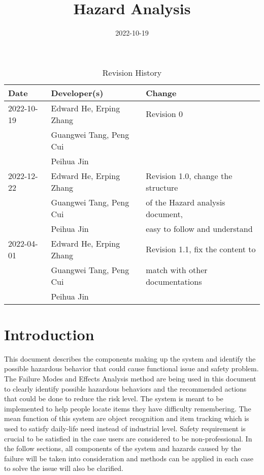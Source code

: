 \documentclass{article}
\title{Hazard Analysis\\\progname}
\author{\authname}
\date{2022-10-19}
\begin{document}
\maketitle

\newpage

\begin{table}[hp]
\caption{Revision History} \label{TblRevisionHistory}
\begin{tabularx}{\textwidth}{llX}
\toprule
\textbf{Date} & \textbf{Developer(s)} & \textbf{Change}\\
\midrule
2022-10-19 & Edward He, Erping Zhang & Revision 0\\
& Guangwei Tang, Peng Cui & \\
& Peihua Jin & \\
2022-12-22 & Edward He, Erping Zhang & Revision 1.0, change the structure\\ 
& Guangwei Tang, Peng Cui & of the Hazard analysis document,\\
& Peihua Jin &  easy to follow and understand\\
2022-04-01 & Edward He, Erping Zhang & Revision 1.1, fix the content to\\ 
& Guangwei Tang, Peng Cui & match with other documentations\\
& Peihua Jin & \\
\bottomrule
\end{tabularx}
\end{table}

\newpage


\tableofcontents
\listoftables

\newpage
\section{Introduction}
This document describes the components making up the system and identify the possible hazardous behavior that could cause functional issue and safety problem. The Failure Modes and Effects Analysis method are being used in this document to clearly identify possible hazardous behaviors and the recommended actions that could be done to reduce the risk level. The system is meant to be implemented to help people locate items they have difficulty remembering. The mean function of this system are object recognition and item tracking which is used to satisfy daily-life need instead of industrial level. Safety requirement is crucial to be satisfied in the case users are considered to be non-professional. In the follow sections, all components of the system and hazards caused by the failure will be taken into consideration and methods can be applied in each case to solve the issue will also be clarified.
\end{document}
